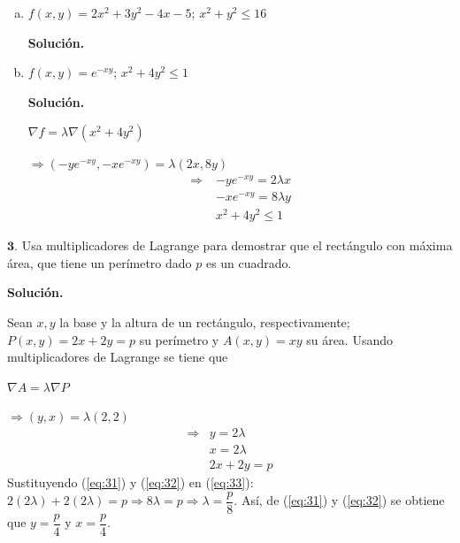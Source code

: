 \documentclass[fleqn, 12pt]{article}
\begin{document}
\begin{list}{\bfseries Ejercicio}{ \addtolength{\itemindent}{-1mm}%
    \addtolength{\labelsep}{-1mm}%
    \addtolength{\leftmargin}{-1cm}%
    \addtolength{\labelwidth}{-1cm} }
    \begin{enumerate}[a)]
        \item $ f(x,y) = 2x^2 + 3y^2 - 4x - 5 $; \; $ x^2 + y^2 \leq 16 $
        
        \textbf{Solución.}

        \item $ f(x,y) = e^{-xy} $; \; $ x^2 + 4y^2 \leq 1 $
        
        \textbf{Solución.}

        $ \nabla f = \lambda \nabla (x^2 + 4y^2) $

        $ \Longrightarrow (-y e^{-xy}, -x e^{-xy}) = \lambda (2x, 8y) $
        \begin{align}
            \Longrightarrow \; & -y e^{-xy} = 2 \lambda x \label{eq:2b1} \\
            & -x e^{-xy} = 8 \lambda y \label{eq:2b2} \\
            &  x^2 + 4y^2 \leq 1 \label{eq:2b3}
        \end{align}

    \end{enumerate}

    \item $ \mathbf{3.} $ Usa multiplicadores de Lagrange para demostrar que el rectángulo con máxima área, que tiene un perímetro dado $ p $ es un cuadrado.
    
    \textbf{Solución.}

    Sean $ x, y $ la base y la altura de un rectángulo, respectivamente; $ P(x,y) = 2x + 2y = p $ su perímetro y $ A(x,y) = xy $ su área. Usando multiplicadores de Lagrange se tiene que

    $ \nabla A = \lambda \nabla P $

    $ \Longrightarrow (y,x) = \lambda (2,2) $
    \begin{align}
        \Longrightarrow & y = 2 \lambda \label{eq:31} \\
        & x = 2 \lambda \label{eq:32} \\
        & 2x + 2y = p \label{eq:33}
    \end{align}
    Sustituyendo (\ref{eq:31}) y (\ref{eq:32}) en (\ref{eq:33}): $ 2(2 \lambda) + 2(2 \lambda) = p \Longrightarrow 8 \lambda = p \Longrightarrow \lambda = \dfrac{p}{8} $. Así, de (\ref{eq:31}) y (\ref{eq:32}) se obtiene que $ y = \dfrac{p}{4} $ y $ x = \dfrac{p}{4} $.


\end{list}
\end{document}
